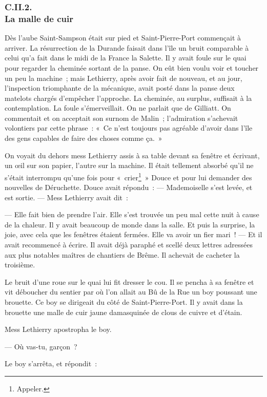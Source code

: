 \documentclass[french,twoside]{book} %
\begin{document}
 \subsubsection[{C.II.2. La malle de cuir}]{C.II.2. \\
La malle de cuir}
\noindent Dès l’aube Saint-Sampson était sur pied et Saint-Pierre-Port commençait à arriver. La résurrection de la Durande faisait dans l’île un bruit comparable à celui qu’a fait dans le midi de la France la Salette. Il y avait foule sur le quai pour regarder la cheminée sortant de la panse. On eût bien voulu voir et toucher un peu la machine ; mais Lethierry, après avoir fait de nouveau, et au jour, l’inspection triomphante de la mécanique, avait posté dans la panse deux matelots chargés d’empêcher l’approche. La cheminée, au surplus, suffisait à la contemplation. La foule s’émerveillait. On ne parlait que de Gilliatt. On commentait et on acceptait son surnom de Malin ; l’admiration s’achevait volontiers par cette phrase : « Ce n’est toujours pas agréable d’avoir dans l’île des gens capables de faire des choses comme ça. »\par
On voyait du dehors mess Lethierry assis à sa table devant sa fenêtre et écrivant, un œil sur son  papier, l’autre sur la machine. Il était tellement absorbé qu’il ne s’était interrompu qu’une fois pour « crier\footnote{ \noindent Appeler.
 } » Douce et pour lui demander des nouvelles de Déruchette. Douce avait répondu : — Mademoiselle s’est levée, et est sortie. — Mess Lethierry avait dit :\par
— Elle fait bien de prendre l’air. Elle s’est trouvée un peu mal cette nuit à cause de la chaleur. Il y avait beaucoup de monde dans la salle. Et puis la surprise, la joie, avec cela que les fenêtres étaient fermées. Elle va avoir un fier mari ! — Et il avait recommencé à écrire. Il avait déjà paraphé et scellé deux lettres adressées aux plus notables maîtres de chantiers de Brême. Il achevait de cacheter la troisième.\par
Le bruit d’une roue sur le quai lui fit dresser le cou. Il se pencha à sa fenêtre et vit déboucher du sentier par où l’on allait au Bû de la Rue un boy poussant une brouette. Ce boy se dirigeait du côté de Saint-Pierre-Port. Il y avait dans la brouette une malle de cuir jaune damasquinée de clous de cuivre et d’étain.\par
Mess Lethierry apostropha le boy.\par
— Où vas-tu, garçon ?\par
Le boy s’arrêta, et répondit :\par
\end{document}
